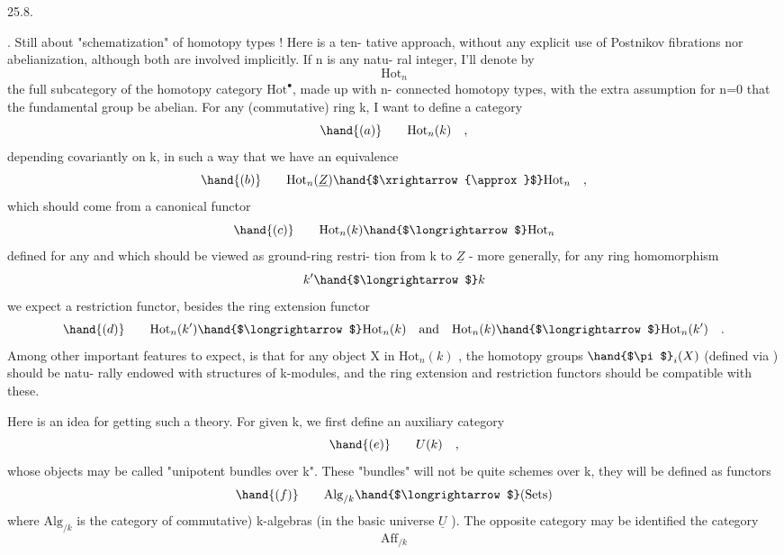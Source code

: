 
25.8.

. Still about "schematization" of homotopy types ! Here is a ten-%
tative approach,  without any explicit use of Postnikov fibrations nor
abelianization,  although both are involved implicitly.  If n is any natu-%
ral integer,  I'll denote by
\[ \mathrm{Hot}_n \]
the full subcategory of the  homotopy category  $\mathrm{Hot}^{\bullet}$,  made up with n-%
connected homotopy types,  with the extra assumption for n=0 that the
fundamental group be abelian.  For any (commutative) ring k,  I want to
define a category
\[ \hand{(a)} \qquad \mathrm{Hot}_n(k) \quad , \]
depending covariantly on k,  in such a way that we have an equivalence
\[ \hand{(b)} \qquad \mathrm{Hot}_n(\underline{Z}) \hand{$\xrightarrow{\approx}$} \mathrm{Hot}_n \quad , \]
which should come from a canonical functor
\[ \hand{(c)} \qquad \mathrm{Hot}_n(k) \hand{$\longrightarrow$} \mathrm{Hot}_n \]
defined  for any and which should be viewed as ground-ring restri-%
tion from k to $\underline{Z}$  -  more generally,  for any ring homomorphism
\[ k' \hand{$\longrightarrow$} k \]
we expect a restriction functor,  besides the ring extension functor
\[ \hand{(d)} \qquad \mathrm{Hot}_n(k') \hand{$\longrightarrow$} \mathrm{Hot}_n(k) \quad \text{and} \quad \mathrm{Hot}_n(k) \hand{$\longrightarrow$} \mathrm{Hot}_n(k') \quad . \]
Among other important features to expect,  is that for any object X in
$\mathrm{Hot}_n(k)$ ,  the homotopy groups $\hand{$\pi$}_i(X)$  (defined via ) should be natu-%
rally endowed with structures of k-modules,  and the ring extension and
restriction functors should be compatible with these.

Here is an idea for getting such a theory.  For given k,  we first
define an auxiliary category
\[ \hand{(e)} \qquad U(k) \quad , \]
whose objects may be called "unipotent bundles over k".  
These "bundles" will not be quite schemes over k,  they will be defined
as functors
\[ \hand{(f)} \qquad \mathrm{Alg}_{/k} \hand{$\longrightarrow$} (\mathrm{Sets}) \]
where $\mathrm{Alg}_{/k}$  is the category of \hand{(}commutative) k-algebras (in the basic
universe $\underline{U}$ ).  The opposite category may be identified  the category
\[ \mathrm{Aff}_{/k} \]

